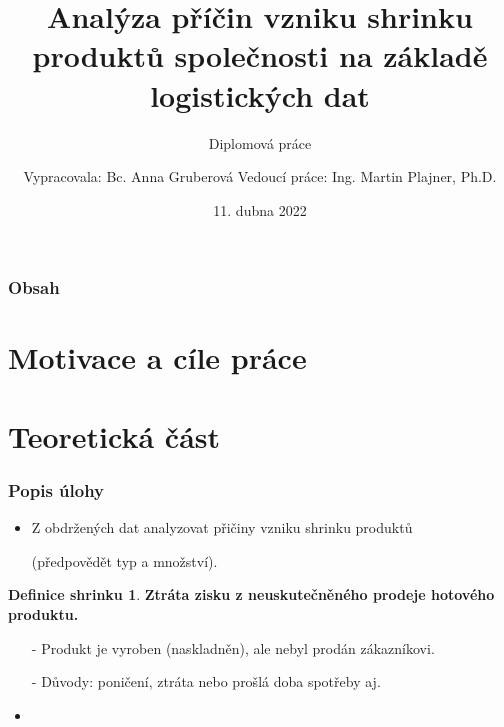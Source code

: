 \documentclass{beamer}
\author[Bc. Anna Gruberová]{Vypracovala: Bc. Anna Gruberová  \linebreak  Vedoucí práce: Ing. Martin Plajner, Ph.D.}
\institute[]{Fakulta jaderná a fyzikálně inženýrská ČVUT v Praze}
\date{11. dubna 2022}
\title{Analýza příčin vzniku shrinku produktů společnosti na základě logistických dat}
\subtitle{Diplomová práce}
\theoremstyle{definition}
\newtheorem{definice}{Definice shrinku}
\begin{document}
{
  \begin{frame}[plain]
	\vspace{0.8cm}
    \titlepage 
	\vspace{-0.8cm}
	
    \end{frame}
}
    
\begin{frame}
  \frametitle{Obsah}
  \tableofcontents
\end{frame}

\section{Motivace a cíle práce}
   



\section{Teoretická část}
   
\begin{frame}
    \frametitle{Popis úlohy}
	\begin{itemize}
    	\item Z obdržených dat analyzovat přičiny vzniku shrinku produktů
    	\item[] (předpovědět typ a množství).
    \end{itemize}

	\begin{definice}
		\textbf{Ztráta zisku z neuskutečněného prodeje hotového produktu.}
		\begin{itemize}
			\item[ -]Produkt je vyroben (naskladněn), ale nebyl prodán zákazníkovi. 
			\item[ -]Důvody: poničení, ztráta nebo prošlá doba spotřeby aj. 
		\end{itemize}
	\end{definice}
	
    \begin{itemize}
    	\item 
    \end{itemize}

\end{frame}
\end{document}
